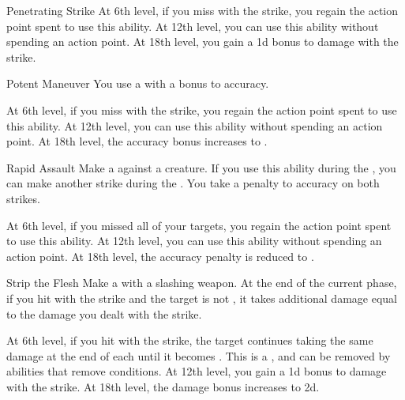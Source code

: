 {\begin{ability}{Penetrating Strike}
                At 6th level, if you miss with the strike, you regain the action point spent to use this ability.
                At 12th level, you can use this ability without spending an action point.
                At 18th level, you gain a \plus1d bonus to damage with the strike.
            \end{ability}

            \begin{ability}{Potent Maneuver}
                You use a  with a  bonus to accuracy.

                At 6th level, if you miss with the strike, you regain the action point spent to use this ability.
                At 12th level, you can use this ability without spending an action point.
                At 18th level, the accuracy bonus increases to .
            \end{ability}

            \begin{ability}{Rapid Assault}
                Make a  against a creature.
                If you use this ability during the , you can make another strike during the .
                You take a  penalty to accuracy on both strikes.

                At 6th level, if you missed all of your targets, you regain the action point spent to use this ability.
                At 12th level, you can use this ability without spending an action point.
                At 18th level, the accuracy penalty is reduced to .
            \end{ability}

            \begin{ability}{Strip the Flesh}
                Make a  with a slashing weapon.
                At the end of the current phase, if you hit with the strike and the target is not , it takes additional damage equal to the damage you dealt with the strike.

                At 6th level, if you hit with the strike, the target continues taking the same damage at the end of each  until it becomes .
                This is a , and can be removed by abilities that remove conditions.
                At 12th level, you gain a \plus1d bonus to damage with the strike.
                At 18th level, the damage bonus increases to \plus2d.
            \end{ability}

}
